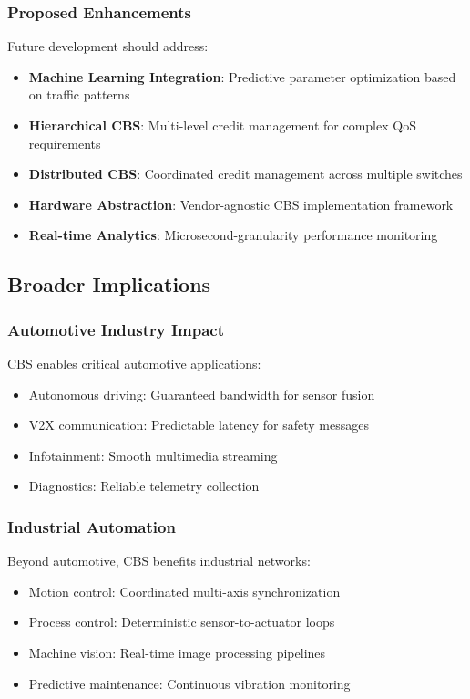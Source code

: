 \documentclass[10pt, journal, compsoc]{IEEEtran}
\begin{document}
\subsubsection{Proposed Enhancements}

Future development should address:

\begin{itemize}
    \item \textbf{Machine Learning Integration}: Predictive parameter optimization based on traffic patterns
    \item \textbf{Hierarchical CBS}: Multi-level credit management for complex QoS requirements
    \item \textbf{Distributed CBS}: Coordinated credit management across multiple switches
    \item \textbf{Hardware Abstraction}: Vendor-agnostic CBS implementation framework
    \item \textbf{Real-time Analytics}: Microsecond-granularity performance monitoring
\end{itemize}

\subsection{Broader Implications}

\subsubsection{Automotive Industry Impact}

CBS enables critical automotive applications:
\begin{itemize}
    \item Autonomous driving: Guaranteed bandwidth for sensor fusion
    \item V2X communication: Predictable latency for safety messages
    \item Infotainment: Smooth multimedia streaming
    \item Diagnostics: Reliable telemetry collection
\end{itemize}

\subsubsection{Industrial Automation}

Beyond automotive, CBS benefits industrial networks:
\begin{itemize}
    \item Motion control: Coordinated multi-axis synchronization
    \item Process control: Deterministic sensor-to-actuator loops
    \item Machine vision: Real-time image processing pipelines
    \item Predictive maintenance: Continuous vibration monitoring
\end{itemize}
\end{document}

